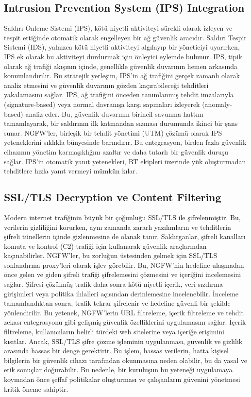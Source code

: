 \subsection{Intrusion Prevention System (IPS) Integration}

Saldırı Önleme Sistemi (IPS), kötü niyetli aktiviteyi sürekli olarak izleyen ve tespit ettiğinde otomatik olarak engelleyen bir ağ güvenlik aracıdır. Saldırı Tespit Sistemi (IDS), yalnızca kötü niyetli aktiviteyi algılayıp bir yöneticiyi uyarırken, IPS ek olarak bu aktiviteyi durdurmak için önleyici eylemde bulunur.
IPS, tipik olarak ağ trafiği akışının içinde, genellikle güvenlik duvarının hemen arkasında konumlandırılır. Bu stratejik yerleşim, IPS'in ağ trafiğini gerçek zamanlı olarak analiz etmesini ve güvenlik duvarının gözden kaçırabileceği tehditleri yakalamasını sağlar. IPS, ağ trafiğini önceden tanımlanmış tehdit imzalarıyla (signature-based) veya normal davranışa karşı sapmaları izleyerek (anomaly-based) analiz eder. Bu, güvenlik duvarının birincil savunma hattını tamamlayarak, bir saldırının ilk katmandan sızması durumunda ikinci bir şans sunar.
NGFW'ler, birleşik bir tehdit yönetimi (UTM) çözümü olarak IPS yeteneklerini sıklıkla bünyesinde barındırır. Bu entegrasyon, birden fazla güvenlik cihazının yönetim karmaşıklığını azaltır ve daha tutarlı bir güvenlik duruşu sağlar. IPS'in otomatik yanıt yetenekleri, BT ekipleri üzerinde yük oluşturmadan tehditlere hızla yanıt vermeyi mümkün kılar.

\subsection{SSL/TLS Decryption ve Content Filtering}

Modern internet trafiğinin büyük bir çoğunluğu SSL/TLS ile şifrelenmiştir. Bu, verilerin gizliliğini korurken, aynı zamanda zararlı yazılımların ve tehditlerin şifreli tünellerin içinde gizlenmesine de olanak tanır. Saldırganlar, şifreli kanalları komuta ve kontrol (C2) trafiği için kullanarak güvenlik araçlarından kaçınabilirler.
NGFW'ler, bu zorluğun üstesinden gelmek için SSL/TLS sonlandırma proxy'leri olarak işlev görebilir. Bu, NGFW'nin hedefine ulaşmadan önce gelen ve giden şifreli trafiği şifrelemesini çözmesini ve içeriğini incelemesini sağlar. Şifresi çözülmüş trafik daha sonra kötü niyetli içerik, veri sızdırma girişimleri veya politika ihlalleri açısından derinlemesine incelenebilir. İnceleme tamamlandıktan sonra, trafik tekrar şifrelenir ve hedefine güvenli bir şekilde yönlendirilir.
Bu yetenek, NGFW'lerin URL filtreleme, içerik filtreleme ve tehdit zekası entegrasyonu gibi gelişmiş güvenlik özelliklerini uygulamasını sağlar. İçerik filtreleme, kullanıcıların belirli türdeki web sitelerine veya içeriğe erişimini kısıtlar. Ancak, SSL/TLS şifre çözme işleminin uygulanması, güvenlik ve gizlilik arasında hassas bir denge gerektirir. Bu işlem, hassas verilerin, hatta kişisel bilgilerin bir güvenlik cihazı tarafından okunmasına neden olabilir, bu da yasal ve etik sonuçlar doğurabilir. Bu nedenle, bir kuruluşun bu yeteneği uygulamaya koymadan önce şeffaf politikalar oluşturması ve çalışanların güvenini yönetmesi kritik öneme sahiptir.

